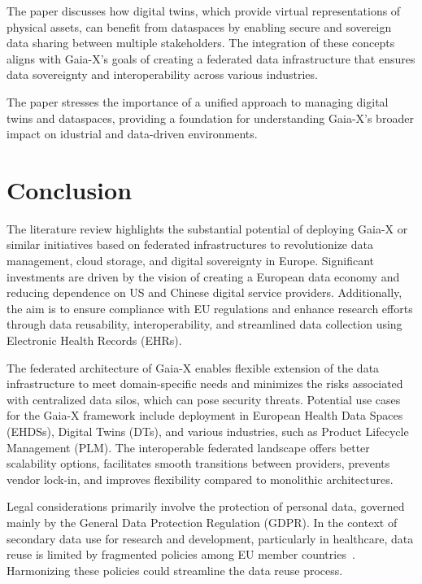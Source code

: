 The paper discusses how digital twins, which provide virtual representations of physical assets, can benefit from dataspaces by enabling secure and sovereign data sharing between multiple stakeholders.
The integration of these concepts aligns with Gaia-X's goals of creating a federated data infrastructure that ensures data sovereignty and interoperability across various industries.

The paper stresses the importance of a unified approach to managing digital twins and dataspaces, providing a foundation for understanding Gaia-X's broader impact on idustrial and data-driven environments.

\section{Conclusion}\label{sec:conclusion}

The literature review highlights the substantial potential of deploying Gaia-X or similar initiatives based on federated infrastructures to revolutionize data management, cloud storage, and digital sovereignty in Europe.
Significant investments are driven by the vision of creating a European data economy and reducing dependence on US and Chinese digital service providers.
Additionally, the aim is to ensure compliance with EU regulations and enhance research efforts through data reusability, interoperability, and streamlined data collection using Electronic Health Records (EHRs).

The federated architecture of Gaia-X enables flexible extension of the data infrastructure to meet domain-specific needs and minimizes the risks associated with centralized data silos, which can pose security threats.
Potential use cases for the Gaia-X framework include deployment in European Health Data Spaces (EHDSs), Digital Twins (DTs), and various industries, such as Product Lifecycle Management (PLM). The interoperable federated landscape offers better scalability options, facilitates smooth transitions between providers, prevents vendor lock-in, and improves flexibility compared to monolithic architectures.

Legal considerations primarily involve the protection of personal data, governed mainly by the General Data Protection Regulation (GDPR). In the context of secondary data use for research and development, particularly in healthcare, data reuse is limited by fragmented policies among EU member countries~\cite{legal_and_technological_aspects_of_ehds}.
Harmonizing these policies could streamline the data reuse process.

